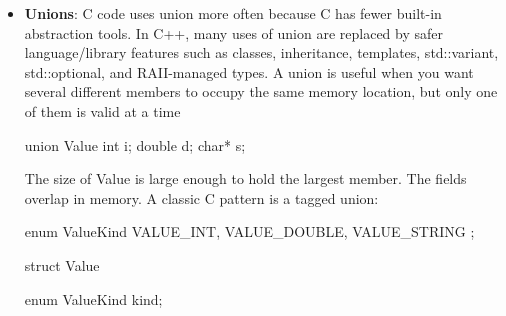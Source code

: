 \documentclass{report}
\begin{document}
\begin{itemize}
            \begin{cppcode}
                f(int x) {...}
            \end{cppcode}
            \bigbreak \noindent 
            Suppose $f$ returns a pointer a function that returns void and accepts a single double.
            \bigbreak \noindent 
            \begin{cppcode}
                typedef void (*fp)(double);
                fp f(int x) {...}
            \end{cppcode}
            \bigbreak \noindent 
            But, what if we didn't want to use typedef. Then, we wrap the function $f$ inside the function pointer type.
            \bigbreak \noindent 
            \begin{cppcode}
                void (*f(int x))(double y) { ... }
            \end{cppcode}
            \bigbreak \noindent 
            Notice how $fp$ became the signature (excluding a return value) of $f$. Read as: "$f$" is a function that takes an int and returns a pointer to a function that takes a double and returns void.
        \item \textbf{Unions}: C code uses union more often because C has fewer built-in abstraction tools. In C++, many uses of union are replaced by safer language/library features such as classes, inheritance, templates, std::variant, std::optional, and RAII-managed types.
            \bigbreak \noindent 
            A union is useful when you want several different members to occupy the same memory location, but only one of them is valid at a time
            \bigbreak \noindent 
            \begin{cppcode}
                union Value {
                    int i;
                    double d;
                    char* s;
                }
            \end{cppcode}
            \bigbreak \noindent 
            The size of Value is large enough to hold the largest member. The fields overlap in memory.
            \bigbreak \noindent 
            A classic C pattern is a tagged union:
            \bigbreak \noindent 
            \begin{cppcode}
                enum ValueKind {
                    VALUE_INT,
                    VALUE_DOUBLE,
                    VALUE_STRING
                };

                struct Value {
                    enum ValueKind kind;

}
\end{cppcode}
\end{itemize}
\end{document}

